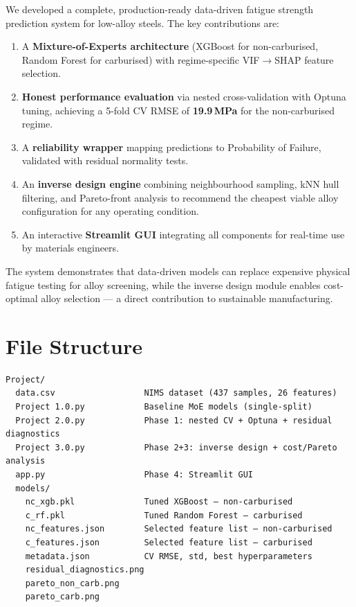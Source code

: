 \documentclass[12pt,a4paper]{article}
\begin{document}
We developed a complete, production-ready data-driven fatigue strength prediction system for
low-alloy steels. The key contributions are:

\begin{enumerate}[nosep]
  \item A \textbf{Mixture-of-Experts architecture} (XGBoost for non-carburised, Random Forest for
        carburised) with regime-specific VIF$\to$SHAP feature selection.
  \item \textbf{Honest performance evaluation} via nested cross-validation with Optuna tuning,
        achieving a 5-fold CV RMSE of \textbf{19.9\,MPa} for the non-carburised regime.
  \item A \textbf{reliability wrapper} mapping predictions to Probability of Failure, validated
        with residual normality tests.
  \item An \textbf{inverse design engine} combining neighbourhood sampling, kNN hull filtering,
        and Pareto-front analysis to recommend the cheapest viable alloy configuration for any
        operating condition.
  \item An interactive \textbf{Streamlit GUI} integrating all components for real-time use by
        materials engineers.
\end{enumerate}

The system demonstrates that data-driven models can replace expensive physical fatigue testing for
alloy screening, while the inverse design module enables cost-optimal alloy selection — a direct
contribution to sustainable manufacturing.

\appendix
\section{File Structure}

\begin{lstlisting}
Project/
  data.csv                  NIMS dataset (437 samples, 26 features)
  Project 1.0.py            Baseline MoE models (single-split)
  Project 2.0.py            Phase 1: nested CV + Optuna + residual diagnostics
  Project 3.0.py            Phase 2+3: inverse design + cost/Pareto analysis
  app.py                    Phase 4: Streamlit GUI
  models/
    nc_xgb.pkl              Tuned XGBoost — non-carburised
    c_rf.pkl                Tuned Random Forest — carburised
    nc_features.json        Selected feature list — non-carburised
    c_features.json         Selected feature list — carburised
    metadata.json           CV RMSE, std, best hyperparameters
    residual_diagnostics.png
    pareto_non_carb.png
    pareto_carb.png
\end{lstlisting}
\end{document}
